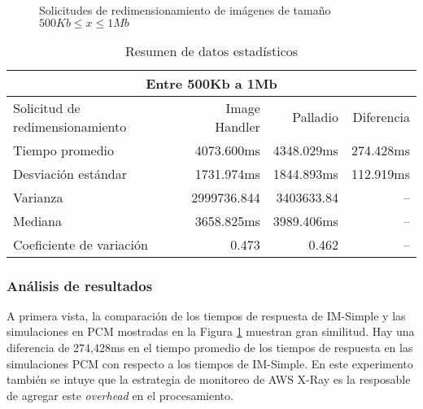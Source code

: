 \hspace{-2cm}
\begin{figure}[h]
\caption{Solicitudes de redimensionamiento de imágenes de tamaño $500Kb \leq x \leq 1Mb$}
\label{fig:comparacion-imsimple-palladio-1mb}
\end{figure}

\begin{table}
    \centering
    \begin{tabular}{l|r|r|r}
        \toprule[1.5pt]
         \multicolumn{4}{c}{\textbf{Entre 500Kb a 1Mb}} \\
        \midrule
        Solicitud de redimensionamiento  & Image Handler & Palladio & Diferencia\\  
        \midrule        
        Tiempo promedio  & 4073.600ms & 4348.029ms & 274.428ms\\
        Desviación estándar & 1731.974ms & 1844.893ms & 112.919ms\\
        Varianza & 2999736.844 & 3403633.84 & --\\
        Mediana & 3658.825ms & 3989.406ms & -- \\
        Coeficiente de variación & 0.473 & 0.462 & -- \\                      
        \bottomrule[1.5pt]
    \end{tabular}
    \caption{Resumen de datos estadísticos}
    \label{table:datos-estadisticos-hasta-1mb}
\end{table}

\subsubsection{Análisis de resultados}
A primera vista, la comparación de los tiempos de respuesta de IM-Simple y las simulaciones en PCM mostradas en la Figura \ref{fig:comparacion-imsimple-palladio-1mb} muestran gran similitud. Hay una diferencia de 274,428ms en el tiempo promedio de los tiempos de respuesta en las simulaciones PCM con respecto a los tiempos de IM-Simple. En este experimento también se intuye que la estrategia de monitoreo de AWS X-Ray es la resposable de agregar este \emph{overhead} en el procesamiento.

